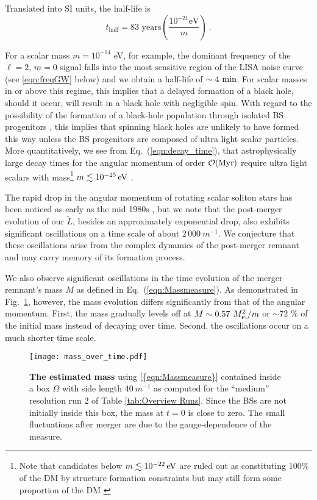 \documentclass[11pt]{report}  %
\newcommand{\mpl}{M_{\mbox{\tiny Pl}}}
\begin{document}
Translated into SI units, the half-life is
\begin{equation}
    t_{\text{half}} = 83 \text{ years}  \left(\frac{10^{-21}
    \text{eV}}{m}\right)~\label{eqn:decay_time}.
\end{equation}


%
For a scalar mass $m =  10^{-14}$ eV, for example,
the dominant frequency of the $\ell=2$, $m=0$ signal
falls into the most sensitive region of the LISA noise curve (see \cref{eqn:freqGW} below) and we obtain a half-life of $\sim4~{\rm min}$. For scalar masses in or above this regime, this implies
that a delayed formation of a black hole, should it occur,
will result in a black hole with negligible spin. With regard to
the possibility of the formation of a black-hole population
through isolated BS progenitors
\cite{Helfer:2016ljl,Muia:2019coe}, this implies that
spinning black holes are unlikely to have formed this way unless
the BS progenitors are composed of ultra light scalar particles.
More quantitatively, we see from
Eq.~(\ref{eqn:decay_time}), that
astrophysically large decay times for the angular momentum
of order
$\mathcal{O}({\rm Myr})$ require ultra light
scalars with mass\footnote{Note that candidates below $m\lesssim 10^{-22}\,{\rm eV}$ are ruled out as constituting 100\% of the DM by structure formation constraints but may still form some proportion of the DM \cite{Marsh:2015xka}}
$m\lesssim 10^{-25}\,{\rm eV}$ .

The rapid drop in the angular momentum of rotating
scalar soliton stars has been noticed as early as the mid 1980s
\cite{Lee:1986ts,Friedberg:1986tq},
but we note that the post-merger evolution of our $\tilde{L}$,
besides an approximately exponential drop, also exhibits
significant oscillations on a time scale of about
$2\,000~m^{-1}$. We conjecture that these oscillations
arise from the complex dynamics of the post-merger remnant
and may carry memory of its formation process.

We also observe significant oscillations in the time evolution
of the merger remnant's mass $M$ as defined in Eq.~(\ref{eqn:Massmeasure}). As demonstrated in
Fig.~\ref{fig:energy}, however, the mass evolution differs
significantly from that of the angular momentum.
First, the mass gradually levels off
at $M \sim 0.57~\mpl^2/m$ or $\sim 72$ \% of the initial mass instead of decaying over time.
Second, the oscillations occur on a much shorter time scale.

\begin{figure}[t]
\begin{center}
    {\texttt{[image: mass\_over\_time.pdf]}}
    \caption{{\bf The estimated mass} using \cref{{eqn:Massmeasure}}
    contained inside a box $\Omega$ with side length $40~m^{-1}$ as computed for the ``medium'' 
    resolution run 2 of Table \ref{tab:Overview Runs}. 
    Since the BSs are
    not initially inside this box, the mass at $t = 0$ is close to zero. The small fluctuations after merger
   are due to the gauge-dependence of the measure.
   }
\label{fig:energy}
\end{center}
\end{figure}
\end{document}
